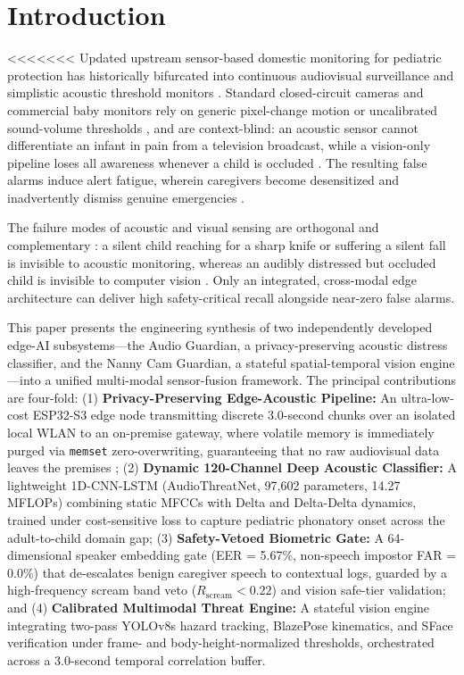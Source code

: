 \documentclass[conference]{IEEEtran}
\begin{document}
\section{Introduction}
<<<<<<< Updated upstream
 sensor-based domestic monitoring for pediatric protection has historically bifurcated into continuous audiovisual surveillance and simplistic acoustic threshold monitors \cite{b2}. Standard closed-circuit cameras and commercial baby monitors rely on generic pixel-change motion or uncalibrated sound-volume thresholds \cite{b3, b14}, and are context-blind: an acoustic sensor cannot differentiate an infant in pain from a television broadcast, while a vision-only pipeline loses all awareness whenever a child is occluded \cite{b17}. The resulting false alarms induce alert fatigue, wherein caregivers become desensitized and inadvertently dismiss genuine emergencies \cite{b10}.

The failure modes of acoustic and visual sensing are orthogonal and complementary \cite{b17}: a silent child reaching for a sharp knife or suffering a silent fall is invisible to acoustic monitoring, whereas an audibly distressed but occluded child is invisible to computer vision \cite{b2}. Only an integrated, cross-modal edge architecture can deliver high safety-critical recall alongside near-zero false alarms.

This paper presents the engineering synthesis of two independently developed edge-AI subsystems---the Audio Guardian, a privacy-preserving acoustic distress classifier, and the Nanny Cam Guardian, a stateful spatial-temporal vision engine---into a unified multi-modal sensor-fusion framework. The principal contributions are four-fold: (1) \textbf{Privacy-Preserving Edge-Acoustic Pipeline:} An ultra-low-cost ESP32-S3 edge node transmitting discrete 3.0-second chunks over an isolated local WLAN to an on-premise gateway, where volatile memory is immediately purged via \texttt{memset} zero-overwriting, guaranteeing that no raw audiovisual data leaves the premises \cite{b1}; (2) \textbf{Dynamic 120-Channel Deep Acoustic Classifier:} A lightweight 1D-CNN-LSTM (AudioThreatNet, 97,602 parameters, 14.27 MFLOPs) combining static MFCCs with Delta and Delta-Delta dynamics, trained under cost-sensitive loss to capture pediatric phonatory onset across the adult-to-child domain gap; (3) \textbf{Safety-Vetoed Biometric Gate:} A 64-dimensional speaker embedding gate (EER = 5.67\%, non-speech impostor FAR = 0.0\%) that de-escalates benign caregiver speech to contextual logs, guarded by a high-frequency scream band veto ($R_{\text{scream}} < 0.22$) and vision safe-tier validation; and (4) \textbf{Calibrated Multimodal Threat Engine:} A stateful vision engine integrating two-pass YOLOv8s hazard tracking, BlazePose kinematics, and SFace verification under frame- and body-height-normalized thresholds, orchestrated across a 3.0-second temporal correlation buffer.
\end{document}
